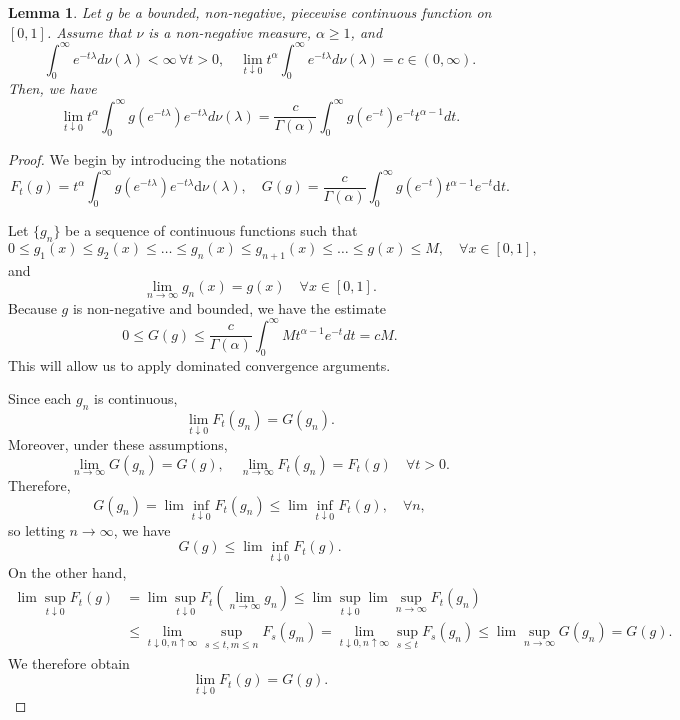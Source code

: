 \documentclass[letterpaper,12pt]{amsart}
\newtheorem{lem}[thm]{Lemma}
\begin{document}
\begin{lem} \label{klemma2}
Let $g$ be a bounded, non-negative, piecewise continuous function on $[0,1]$.  Assume that $\nu$ is a non-negative measure, $\alpha \geq 1$, and
$$\int_0 ^\infty e^{-t \lambda} d\nu (\lambda) < \infty \, \forall t > 0, \quad \lim_{t \downarrow 0} t^\alpha \int_0 ^\infty e^{-t\lambda} d\nu(\lambda) = c \in (0, \infty).$$
Then, we have
$$\lim_{t \downarrow 0} t^\alpha \int_0 ^\infty g(e^{-t \lambda}) e^{-t \lambda} d\nu(\lambda) = \frac{c}{\Gamma(\alpha)} \int_0 ^\infty g(e^{-t}) e^{-t} t^{\alpha - 1} dt.$$
\end{lem}
\begin{proof}
We begin by introducing the notations
\begin{equation}
F_t(g) = t^\alpha \int_0^\infty g\left(e^{-t\lambda}\right)e^{-t\lambda} \mathrm d\nu(\lambda),\quad G(g) = \frac{c}{\Gamma(\alpha)}\int_0^\infty g\left(e^{-t}\right)t^{\alpha-1} e^{-t}\mathrm dt.
\end{equation}

Let $\{g_n\}$ be a sequence of continuous functions such that
$$0 \leq g_1(x) \leq g_2(x) \leq \ldots \leq g_n (x) \leq g_{n+1} (x) \leq \ldots \leq g(x) \leq M, \quad \forall x \in [0,1],$$
and
$$\lim_{n \to \infty} g_n (x) = g(x) \quad \forall x \in [0,1].$$
Because $g$ is non-negative and bounded, we have the estimate
$$0 \leq G(g) \leq \frac{c}{\Gamma(\alpha)} \int_0 ^\infty M t^{\alpha-1} e^{-t} dt = cM.$$
This will allow us to apply dominated convergence arguments.


Since each $g_n$ is continuous,
$$\lim_{t \downarrow 0} F_t (g_n) = G(g_n).$$
Moreover, under these assumptions,
$$\lim_{n \to \infty} G(g_n) = G(g), \quad \lim_{n \to \infty} F_t (g_n) = F_t (g) \quad  \forall t > 0.$$
Therefore,
$$G(g_n) = \lim \inf_{t \downarrow 0} F_t (g_n) \leq \lim \inf_{t\downarrow 0} F_t (g), \quad \forall n,$$
so letting $n \to \infty$, we have
$$G(g) \leq \lim \inf_{t \downarrow 0} F_t (g).$$
On the other hand,
\begin{equation*}
\begin{split}
\lim \sup_{t \downarrow 0} F_t (g) &= \lim \sup_{t \downarrow 0} F_t (\lim_{n \to \infty} g_n) \leq \lim \sup_{t \downarrow 0} \lim \sup_{n \to \infty} F_t (g_n) \\
&\leq \lim_{t \downarrow 0, n \uparrow \infty} \sup_{s \leq t, m \leq n} F_s (g_m)= \lim_{t \downarrow 0, n \uparrow \infty} \sup_{s \leq t} F_s (g_n) \leq \lim \sup_{n \to \infty} G(g_n) = G(g).
\end{split}
\end{equation*}
We therefore obtain
$$\lim_{t \downarrow 0} F_t (g) = G(g).$$
\end{proof}
\end{document}
